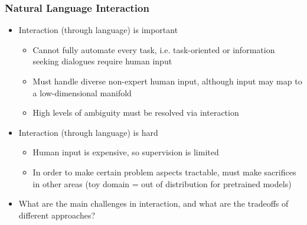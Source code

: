 \documentclass{beamer}
\begin{document}
\begin{frame}
\frametitle{Natural Language Interaction}
\begin{itemize}
\item Interaction (through language) is important 
    \begin{itemize}
    \item Cannot fully automate every task,
        i.e. task-oriented or information seeking dialogues
        require human input
    \item Must handle diverse non-expert human input,
        although input may map to a low-dimensional manifold
    \item High levels of ambiguity must be resolved via interaction
    \end{itemize}
\item Interaction (through language) is hard 
    \begin{itemize}
    \item Human input is expensive, so supervision is limited
    \item In order to make certain problem aspects tractable,
        must make sacrifices in other areas
        (toy domain = out of distribution for pretrained models)
    \end{itemize}
\item What are the main challenges in interaction,
    and what are the tradeoffs of different approaches?
\end{itemize}
\end{frame}
\end{document}
